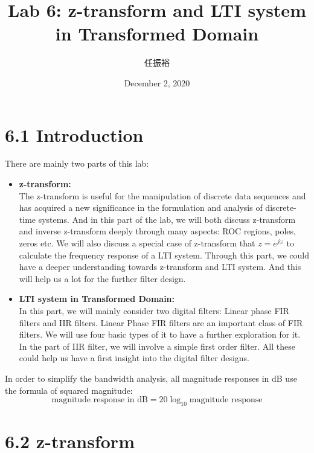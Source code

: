 \documentclass[onecolumn,oneside]{SUSTechHomework}
\begin{document}
\title{Lab 6: z-transform and LTI system in Transformed Domain}
\author{任振裕}
\date{December 2, 2020}
\maketitle 
\tableofcontents
\section*{6.1 Introduction}
There are mainly two parts of this lab: 
\begin{itemize}
    \item \textbf{z-transform:}\\
    The z-transform is useful for the manipulation of discrete data sequences and has 
    acquired a new significance in the formulation and analysis of discrete-time 
    systems. And in this part of the lab, we will both discuss z-transform and inverse 
    z-transform deeply through many aspects: ROC regions, poles, zeros etc. We will also discuss
    a special case of z-transform that $z=e^{j\omega}$ to calculate the frequency response of a LTI
    system. Through this part, we could have a deeper understanding towards z-transform and LTI system. And this
    will help us a lot for the further filter design.
    \item \textbf{LTI system in Transformed Domain:}\\
    In this part, we will mainly consider two digital filters: Linear phase FIR filters and IIR filters. Linear Phase FIR filters are an important class of FIR filters.
    We will use four basic types of it to have a further exploration for it. In the part of IIR filter, we will involve a simple first order filter.
    All these could help us have a first insight into the digital filter designs.
\end{itemize}
\begin{warn}
    In order to simplify the bandwidth analysis, all magnitude responses in dB use the formula of
    squared magnitude: 
    $$
    \text{magnitude response in dB}=20\log_{10}\text{magnitude response}
    $$
\end{warn}
\section*{6.2 z-transform}
\end{document}
